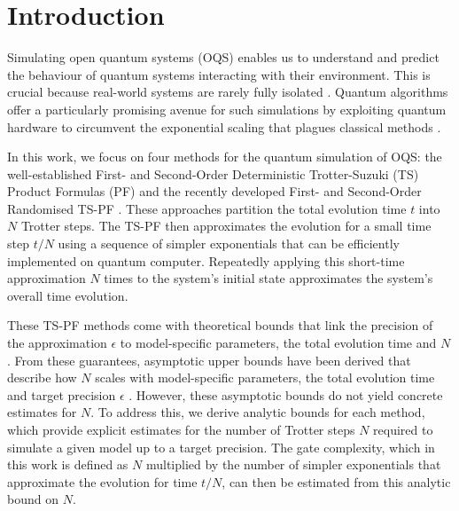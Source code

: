 \documentclass[pdflatex,sn-mathphys-num]{sn-jnl}%
\begin{document}

\maketitle

\section{Introduction}\label{sec1}
Simulating open quantum systems (OQS) enables us to understand and predict the behaviour of quantum systems interacting with their environment. This is crucial because real-world systems are rarely fully isolated \cite{breuer2002theory}. Quantum algorithms \cite{lloyd1996universal,childs2018toward,childs2021theory} offer a particularly promising avenue for such simulations by exploiting quantum hardware to circumvent the exponential scaling that plagues classical methods \cite{cleve2016efficient,kamakari2022digital,pocrnic2023quantum}.

In this work, we focus on four methods for the quantum simulation of OQS: the well-established First- and Second-Order Deterministic Trotter-Suzuki (TS) Product Formulas (PF) \cite{suzuki1990fractal,sweke2015universal} and the recently developed First- and Second-Order Randomised TS-PF \cite{david2024faster}. These approaches partition the total evolution time $t$ into $N$ Trotter steps. The TS-PF then approximates the evolution for a small time step $t/N$ using a sequence of simpler exponentials that can be efficiently implemented on quantum computer. Repeatedly applying this short-time approximation $N$ times to the system's initial state approximates the system's overall time evolution. 

These TS-PF methods come with theoretical bounds that link the precision of the approximation $\epsilon$ to model-specific parameters, the total evolution time and $N$. From these guarantees, asymptotic upper bounds have been derived that describe how $N$ scales with model-specific parameters, the total evolution time and target precision $\epsilon$ \cite{david2024faster}. However, these asymptotic bounds do not yield concrete estimates for $N$. To address this, we derive analytic bounds for each method, which provide explicit estimates for the number of Trotter steps $N$ required to simulate a given model up to a target precision. The gate complexity, which in this work is defined as $N$ multiplied by the number of simpler exponentials that approximate the evolution for time $t/N$, can then be estimated from this analytic bound on $N$. 
\end{document}

